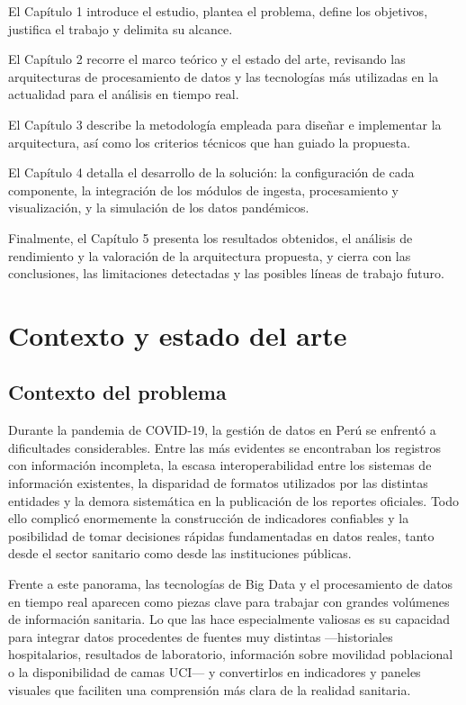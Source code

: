 \documentclass[12pt,a4paper]{article}
\begin{document}
El Capítulo 1 introduce el estudio, plantea el problema, define los objetivos, justifica el trabajo y delimita su alcance.

El Capítulo 2 recorre el marco teórico y el estado del arte, revisando las arquitecturas de procesamiento de datos y las tecnologías más utilizadas en la actualidad para el análisis en tiempo real.

El Capítulo 3 describe la metodología empleada para diseñar e implementar la arquitectura, así como los criterios técnicos que han guiado la propuesta.

El Capítulo 4 detalla el desarrollo de la solución: la configuración de cada componente, la integración de los módulos de ingesta, procesamiento y visualización, y la simulación de los datos pandémicos.

Finalmente, el Capítulo 5 presenta los resultados obtenidos, el análisis de rendimiento y la valoración de la arquitectura propuesta, y cierra con las conclusiones, las limitaciones detectadas y las posibles líneas de trabajo futuro.
\clearpage
\section{Contexto y estado del arte}\label{contexto-y-estado-del-arte}

\subsection{Contexto del problema}\label{contexto-del-problema}

Durante la pandemia de COVID-19, la gestión de datos en Perú se enfrentó a dificultades considerables. Entre las más evidentes se encontraban los registros con información incompleta, la escasa interoperabilidad entre los sistemas de información existentes, la disparidad de formatos utilizados por las distintas entidades y la demora sistemática en la publicación de los reportes oficiales. Todo ello complicó enormemente la construcción de indicadores confiables y la posibilidad de tomar decisiones rápidas fundamentadas en datos reales, tanto desde el sector sanitario como desde las instituciones públicas.

Frente a este panorama, las tecnologías de Big Data y el procesamiento de datos en tiempo real aparecen como piezas clave para trabajar con grandes volúmenes de información sanitaria. Lo que las hace especialmente valiosas es su capacidad para integrar datos procedentes de fuentes muy distintas ---historiales hospitalarios, resultados de laboratorio, información sobre movilidad poblacional o la disponibilidad de camas UCI--- y convertirlos en indicadores y paneles visuales que faciliten una comprensión más clara de la realidad sanitaria.
\end{document}
